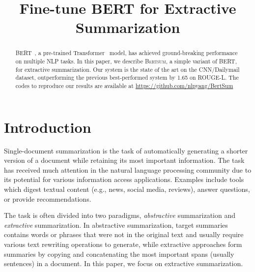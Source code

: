 \title{Fine-tune BERT for Extractive Summarization}



\maketitle
    \begin{abstract}
                \DeclareUrlCommand{\url}{%
    \def\UrlFont{\color{blue}\normalfont}%
}

BERT~\citep{devlin2018bert}, a pre-trained Transformer~\citep{vaswani2017attention} model,  has achieved ground-breaking performance on multiple NLP tasks.
In
this paper, we describe \textsc{Bertsum}, a  simple variant of BERT, for extractive summarization. Our system is the state of the art on the CNN/Dailymail dataset, outperforming the previous best-performed system by 1.65 on ROUGE-L. The codes
to reproduce our results are available at \url{https://github.com/nlpyang/BertSum}

               \DeclareUrlCommand{\url}{%
            \def\UrlFont{\color{magenta}\normalfont}%
        }
        
        
        
        
        
    \end{abstract}
    
    \section{Introduction}
    
    Single-document summarization is the task of automatically generating
    a shorter version of a document while retaining its most important
    information.  The task has received much attention in the natural
    language processing community due to its potential for various
    information access applications. Examples include tools which digest
    textual content (e.g., news, social media,  reviews), answer
    questions, or provide recommendations.
    
    The task is often divided into two paradigms, \textit{abstractive}
    summarization and \textit{extractive}    summarization.
        In abstractive
    summarization, target summaries contains words or phrases that were not in the original text and usually require various text rewriting operations to generate, while extractive approaches
    form summaries by
    copying and concatenating the most important spans (usually
    sentences) in a document.  In this paper, we focus on extractive summarization.
    
